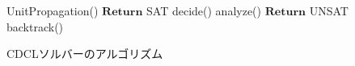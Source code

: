 \documentclass[titlepage]{jsarticle}
\begin{document}
\begin{figure}[!t]
	\begin{algorithm}[H]
		\begin{algorithmic}[1]
				\State UnitPropagation()
						\State $\mathbf{Return}$ SAT
					\Else
						\State decide()
					\EndIf
				\Else
					\State analyze()
						\State $\mathbf{Return}$ UNSAT
					\Else
						\State backtrack()
					\EndIf
				\EndIf
			\EndWhile
		\end{algorithmic}
	\end{algorithm}
	\caption{CDCLソルバーのアルゴリズム}
\end{figure}

\begin{comment}
\begin{figure}[!t]
	\begin{algorithm}[H]
		\begin{algorithmic}[1]
			\While {True}
				\State UnitPropagation()
				\If {矛盾が発生しなかった}
					\If {全ての変数に割当がされている}
						\State $\mathbf{Return}$ SAT
					\Else
						\State SelectNewVariable()
						\State 　- 一番重みが大きい未割当変数を探す
						\State AssignValue()
						\State 　- 探した変数に値を割り当てる
					\EndIf
				\Else
					\State AnalyzeAndBacktrack()
				\EndIf
			\EndWhile
		\end{algorithmic}
	\end{algorithm}
	\caption{CDCLソルバーのアルゴリズム}
\end{figure}
\end{comment}
	

\begin{comment}
\subsubsection{監視リテラル}
SAT solverの実行時間の70\%から90\%は単位伝播の処理で占められているため、効率良く単位節を検出することができればより高速に解を探索することができる。
素朴な方法として各変数$x_i$に対して$x_i$を含む節のリストを用意しておき、
$x_i$に値が割り当てられた時にそのリストを走査することで状態の変化した節を確認する方法がある。
しかしこの方法だとすでに充足されている節の確認を行う必要があり無駄が多くなってしまう。
監視リテラルを用いた方法は節の中の未割当な変数2つを監視する方法である。
節が単位節になる直前の状態は節中のリテラルのうち2つのみが未割当で残りのリテラルに偽が割り当てられている状態となっている。
どちらかのリテラルに偽が割り当てられた時に節は単位節となるため、
節中の全てのリテラルを監視する必要はなく未割当のリテラル2つのみを監視するだけで効率良く単位節を検出することができる。
\end{comment}
\end{document}
